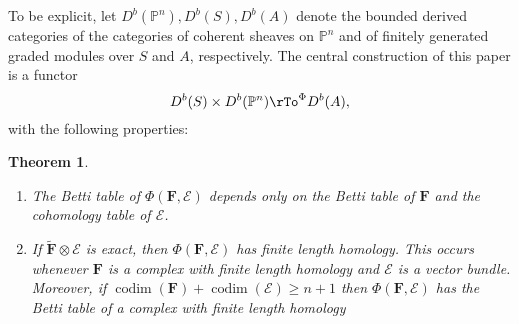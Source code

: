 \documentclass[12pt]{amsart}
\newtheorem{theorem}[lemma]{Theorem}
\theoremstyle{definition}
\theoremstyle{remark}
\newcommand{\kk}{\Bbbk}
\newcommand{\codim}{\operatorname{codim}}
\newcommand{\cE}{\mathcal{E}}
\newcommand{\FF}{\mathbf{F}}
\renewcommand{\P}{{\mathbb P}}
\begin{document}
To be explicit, 
let $D^{b}(\P^{n}), D^{b}(S), D^{b}(A)$ denote the bounded derived categories of the categories of coherent sheaves on $\P^{n}$ and of finitely generated graded modules over $S$ and $A$, respectively.  The central construction of this paper is a functor
$$
D^{b}(S)\times D^{b}(\P^{n})  \rTo^{\Phi} D^{b}(A),
$$
with the following properties:
\begin{theorem}\label{thm:Phi}
\begin{enumerate}
	\item\label{thm:Phi:1}  The Betti table of $\Phi(\FF,\cE)$ depends only on the Betti table of $\FF$ and the cohomology table of $\cE$.
	\item\label{thm:Phi:2}  If $\widetilde{\FF}\otimes \cE$ is exact, then $\Phi(\FF,\cE)$ has finite length homology.  This occurs whenever $\FF$ is a complex with finite length homology and $\cE$ is a vector bundle.  Moreover, if $\codim(\FF)+\codim(\cE)\geq n+1$ then  $\Phi(\FF,\cE)$ has the Betti table of a complex with finite length homology\end{enumerate}
\end{theorem}
\end{document}
